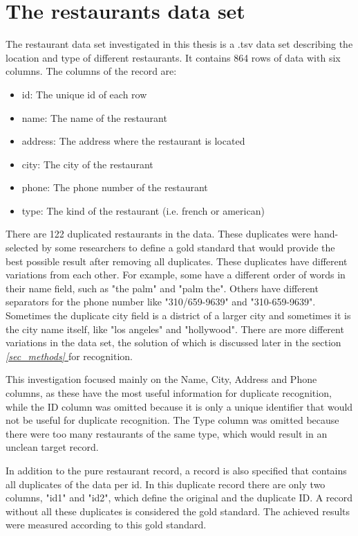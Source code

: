 \documentclass[conference]{IEEEtran}
\newcommand*{\fullref}[1]{\textit{\hyperref[{#1}]{\autoref*{#1} \nameref*{#1}}}}
\begin{document}
\section{The restaurants data set} \label{sec:dataset}
The restaurant data set investigated in this thesis is a .tsv data set describing the location and type of different restaurants. It contains 864 rows of data with six columns. The columns of the record are: 
\begin{itemize}
	\item id: The unique id of each row
	\item name: The name of the restaurant
	\item address: The address where the restaurant is located
	\item city: The city of the restaurant
	\item phone: The phone number of the restaurant
	\item type: The kind of the restaurant (i.e. french or american)
\end{itemize}
There are 122 duplicated restaurants in the data. These duplicates were hand-selected by some researchers to define a gold standard that would provide the best possible result after removing all duplicates\cite{bib:reach_for_gold}. These duplicates have different variations from each other. For example, some have a different order of words in their name field, such as "the palm" and "palm the". Others have different separators for the phone number like "310/659-9639" and "310-659-9639". Sometimes the duplicate city field is a district of a larger city and sometimes it is the city name itself, like "los angeles" and "hollywood". There are more different variations in the data set, the solution of which is discussed later in the section \fullref{sec_methods} for recognition.

This investigation focused mainly on the Name, City, Address and Phone columns, as these have the most useful information for duplicate recognition, while the ID column was omitted because it is only a unique identifier that would not be useful for duplicate recognition. The Type column was omitted because there were too many restaurants of the same type, which would result in an unclean target record.

In addition to the pure restaurant record, a record is also specified that contains all duplicates of the data per id. In this duplicate record there are only two columns, "id1" and "id2", which define the original and the duplicate ID. A record without all these duplicates is considered the gold standard. The achieved results were measured according to this gold standard.
\end{document}
